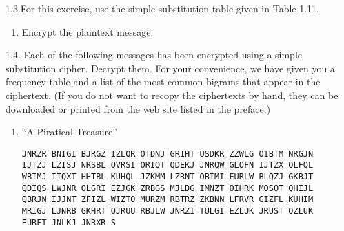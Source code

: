 \begin{exercise}
    {1.3.}For this exercise, use the simple substitution table given in Table 1.11.
    \begin{enumerate}
        \item Encrypt the plaintext message:
    \end{enumerate}
\end{exercise}


\begin{exercise}
    {1.4.} Each of the following messages has been encrypted using a simple substitution cipher. Decrypt them. For your convenience, we have given you a frequency table and a list of the most common bigrams that appear in the ciphertext. (If you do not want to recopy the ciphertexts by hand, they can be downloaded or printed from the web site listed in the preface.)
    \begin{enumerate}
        \item “A Piratical Treasure”
        \begin{flushleft}
            \texttt{JNRZR BNIGI BJRGZ IZLQR OTDNJ GRIHT USDKR ZZWLG OIBTM NRGJN} \\
            \texttt{IJTZJ LZISJ NRSBL QVRSI ORIQT QDEKJ JNRQW GLOFN IJTZX QLFQL} \\
            \texttt{WBIMJ ITQXT HHTBL KUHQL JZKMM LZRNT OBIMI EURLW BLQZJ GKBJT} \\
            \texttt{QDIQS LWJNR OLGRI EZJGK ZRBGS MJLDG IMNZT OIHRK MOSOT QHIJL} \\ 
            \texttt{QBRJN IJJNT ZFIZL WIZTO MURZM RBTRZ ZKBNN LFRVR GIZFL KUHIM} \\ 
            \texttt{MRIGJ LJNRB GKHRT QJRUU RBJLW JNRZI TULGI EZLUK JRUST QZLUK} \\ 
            \texttt{EURFT JNLKJ JNRXR S}
        \end{flushleft}
    \end{enumerate}
\end{exercise}


